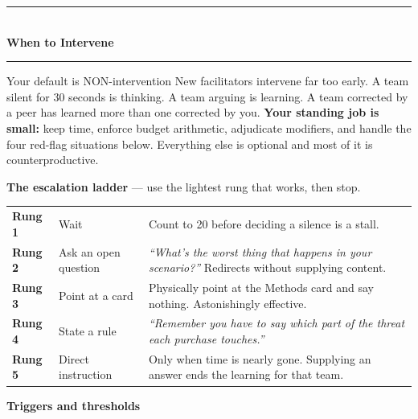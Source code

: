 \documentclass[9pt,letterpaper]{extarticle}
\newcommand{\say}[1]{\textit{``#1''}}
\begin{document}
\newpage
{\color{deep}\rule{\textwidth}{1.5pt}}\\[0.3em]
{\LARGE\bfseries\color{deep} When to Intervene}\\[0.2em]
{\color{deep}\rule{\textwidth}{1.5pt}}

\vspace{0.5em}
\begin{graybox}{Your default is NON-intervention}
New facilitators intervene far too early. A team silent for 30 seconds is
thinking. A team arguing is learning. A team corrected by a peer has learned more
than one corrected by you. \textbf{Your standing job is small:} keep time,
enforce budget arithmetic, adjudicate modifiers, and handle the four red-flag
situations below. Everything else is optional and most of it is
counterproductive.
\end{graybox}

\vspace{0.4em}
\textbf{\color{deep}The escalation ladder} --- use the lightest rung that works, then stop.

\vspace{0.3em}
\small
\begin{tabularx}{\textwidth}{@{}l l X@{}}
\toprule
\textbf{Rung 1} & Wait & Count to 20 before deciding a silence is a stall. \\
\textbf{Rung 2} & Ask an open question & \say{What's the worst thing that happens in your scenario?} Redirects without supplying content. \\
\textbf{Rung 3} & Point at a card & Physically point at the Methods card and say nothing. Astonishingly effective. \\
\textbf{Rung 4} & State a rule & \say{Remember you have to say which part of the threat each purchase touches.} \\
\textbf{Rung 5} & Direct instruction & Only when time is nearly gone. Supplying an answer ends the learning for that team. \\
\bottomrule
\end{tabularx}
\normalsize

\vspace{0.7em}
\textbf{\color{deep}Triggers and thresholds}
\end{document}
